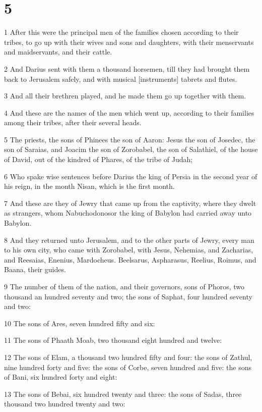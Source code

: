 \chapter{5}

\par 1 After this were the principal men of the families chosen according to their tribes, to go up with their wives and sons and daughters, with their menservants and maidservants, and their cattle.
\par 2 And Darius sent with them a thousand horsemen, till they had brought them back to Jerusalem safely, and with musical [instruments] tabrets and flutes.
\par 3 And all their brethren played, and he made them go up together with them.
\par 4 And these are the names of the men which went up, according to their families among their tribes, after their several heads.
\par 5 The priests, the sons of Phinees the son of Aaron: Jesus the son of Josedec, the son of Saraias, and Joacim the son of Zorobabel, the son of Salathiel, of the house of David, out of the kindred of Phares, of the tribe of Judah;
\par 6 Who spake wise sentences before Darius the king of Persia in the second year of his reign, in the month Nisan, which is the first month.
\par 7 And these are they of Jewry that came up from the captivity, where they dwelt as strangers, whom Nabuchodonosor the king of Babylon had carried away unto Babylon.
\par 8 And they returned unto Jerusalem, and to the other parts of Jewry, every man to his own city, who came with Zorobabel, with Jesus, Nehemias, and Zacharias, and Reesaias, Enenius, Mardocheus. Beelsarus, Aspharasus, Reelius, Roimus, and Baana, their guides.
\par 9 The number of them of the nation, and their governors, sons of Phoros, two thousand an hundred seventy and two; the sons of Saphat, four hundred seventy and two:
\par 10 The sons of Ares, seven hundred fifty and six:
\par 11 The sons of Phaath Moab, two thousand eight hundred and twelve:
\par 12 The sons of Elam, a thousand two hundred fifty and four: the sons of Zathul, nine hundred forty and five: the sons of Corbe, seven hundred and five: the sons of Bani, six hundred forty and eight:
\par 13 The sons of Bebai, six hundred twenty and three: the sons of Sadas, three thousand two hundred twenty and two:
